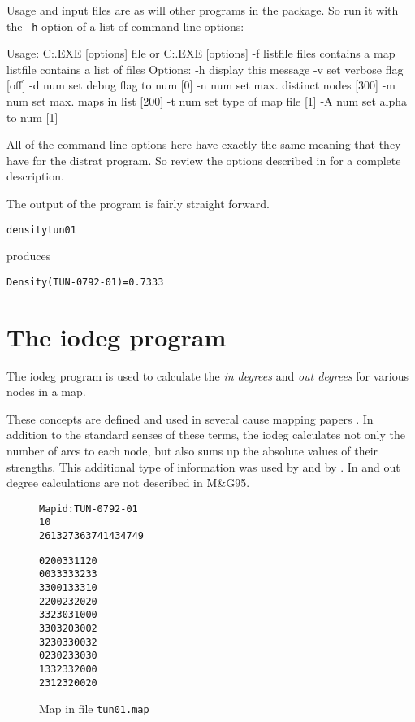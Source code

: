 \documentclass[%
	11pt,
        a4paper,
        twoside]{workrep}
\newcommand*{\prg}[1]{\textsf{#1}}		%
\newcommand*{\file}[1]{\texttt{#1}}		%
\newcommand*{\nt}[1]{\textit{#1}}		%
\newcommand*{\opt}[1]{\texttt{#1}}		%
\newcommand{\MG}{M\&G95\xspace}			%
\begin{document}
Usage and input files are as will other programs in the
package.  So run it with the \opt{-h} option of a list of
command line options:

\begin{verbatimtab}
Usage: C:\BIN\DENSITY.EXE [options] file
   or  C:\BIN\DENSITY.EXE [options] -f listfile
	files contains a map
	listfile contains a list of files
	Options:
		-h	display this message
		-v	set verbose flag [off]
		-d num	set debug flag to num [0]
		-n num	set max. distinct nodes [300]
		-m num	set max. maps in list [200]
		-t num	set type of map file [1]
		-A num	set alpha to num [1]
\end{verbatimtab}

All of the command line options here have exactly the same meaning
that they have for the \prg{distrat} program.
So review the options described in  for
a complete description.

The output of the program is fairly straight forward.
\begin{alltt}
  density tun01
\end{alltt}
produces
\begin{alltt}
Density(TUN-0792-01) = 0.7333
\end{alltt}


\chapter{The \prg{iodeg} program}\label{ch:iodeg}

The \prg{iodeg} program is used to calculate the \nt{in degrees} and
\nt{out degrees} for various nodes in a map.

These concepts are defined and used in several cause mapping papers 
.  In
addition to the standard senses of these terms, the \prg{iodeg}
calculates not only the number of arcs to each node, but also
sums up the absolute values of their strengths.   This additional
type of information was used by  and
by .  In and out degree calculations
are not described in \MG.

\begin{figure}
\caption{Map in file \file{tun01.map}}\label{fig:tun01map}
\begin{alltt}
Map id: TUN-0792-01
10
 2  6 13 27 36 37 41 43 47 49

 0  2  0  0  3  3  1  1  2  0
 0  0  3  3  3  3  3  2  3  3
 3  3  0  0  1  3  3  3  1  0
 2  2  0  0  2  3  2  0  2  0
 3  3  2  3  0  3  1  0  0  0
 3  3  0  3  2  0  3  0  0  2
 3  2  3  0  3  3  0  0  3  2
 0  2  3  0  2  3  3  0  3  0
 1  3  3  2  3  3  2  0  0  0
 2  3  1  2  3  2  0  0  2  0
\end{alltt}
\end{figure}
\end{document}
